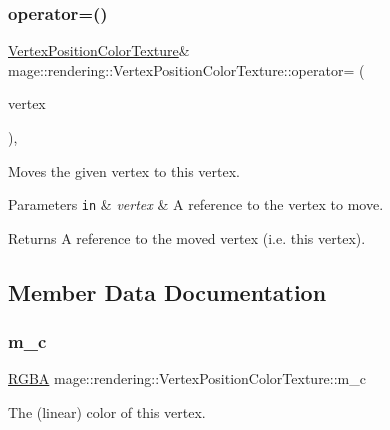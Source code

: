 \subsubsection{\texorpdfstring{operator=()}{operator=()}\hspace{0.1cm}{\footnotesize\ttfamily [2/2]}}
{\footnotesize\ttfamily \mbox{\hyperlink{structmage_1_1rendering_1_1_vertex_position_color_texture}{Vertex\+Position\+Color\+Texture}}\& mage\+::rendering\+::\+Vertex\+Position\+Color\+Texture\+::operator= (\begin{DoxyParamCaption}\item[{\mbox{\hyperlink{structmage_1_1rendering_1_1_vertex_position_color_texture}{Vertex\+Position\+Color\+Texture}} \&\&}]{vertex }\end{DoxyParamCaption})\hspace{0.3cm}{\ttfamily [default]}, {\ttfamily [noexcept]}}

Moves the given vertex to this vertex.


\begin{DoxyParams}[1]{Parameters}
\mbox{\tt in}  & {\em vertex} & A reference to the vertex to move. \\
\hline
\end{DoxyParams}
\begin{DoxyReturn}{Returns}
A reference to the moved vertex (i.\+e. this vertex). 
\end{DoxyReturn}


\subsection{Member Data Documentation}
\mbox{\label{structmage_1_1rendering_1_1_vertex_position_color_texture_acf8f36b78e8366edff1b476e2e97fec5}} 
\subsubsection{\texorpdfstring{m\+\_\+c}{m\_c}}
{\footnotesize\ttfamily \mbox{\hyperlink{structmage_1_1_r_g_b_a}{R\+G\+BA}} mage\+::rendering\+::\+Vertex\+Position\+Color\+Texture\+::m\+\_\+c}

The (linear) color of this vertex. \mbox{\label{structmage_1_1rendering_1_1_vertex_position_color_texture_a924a25377182f6c29ff7f50fba08113c}} 
